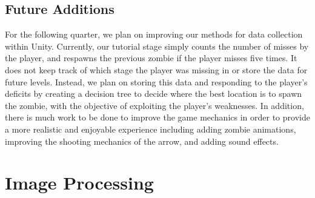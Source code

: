 \documentclass[titlepage, 12pt]{scrartcl}
\begin{document}
    \subsection{Future Additions}
       For the following quarter, we plan on improving our methods for data collection within Unity. Currently, our tutorial stage simply counts the number of misses by the player, and respawns the previous zombie if the player misses five times. It does not keep track of which stage the player was missing in or store the data for future levels. Instead, we plan on storing this data and responding to the player's deficits by creating a decision tree to decide where the best location is to spawn the zombie, with the objective of exploiting the player's weaknesses. In addition, there is much work to be done to improve the game mechanics in order to provide a more realistic and enjoyable experience including adding zombie animations, improving the shooting mechanics of the arrow, and adding sound effects. 
    
\section{Image Processing}
\end{document}
